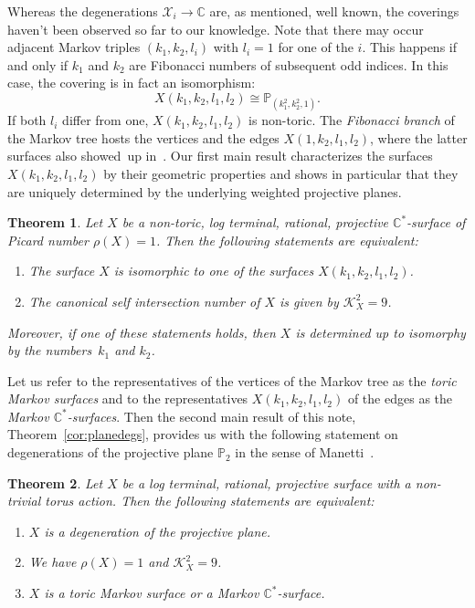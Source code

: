 \documentclass[10pt,a4paper]{amsart}
\newtheorem{thm}{Theorem}[section]
\theoremstyle{definition}
\def\CC{{\mathbb C}}
\def\PP{{\mathbb P}}
\begin{document}
Whereas the degenerations $\mathcal{X}_i \to \CC$
are, as mentioned, well known, the coverings haven't
been observed so far to our knowledge.
Note that there may occur adjacent Markov triples
$(k_1,k_2,l_i)$ with $l_i=1$ for one of the $i$.
This happens if and only if $k_1$ and $k_2$ are
Fibonacci numbers of subsequent odd indices.
In this case, the covering is in fact an isomorphism:
\[
X(k_1,k_2,l_1,l_2) \cong \PP_{(k_1^2,k_2^2,1)}.
\]
If both $l_i$ differ from one, $X(k_1,k_2,l_1,l_2)$
is non-toric.
The \emph{Fibonacci branch} of the Markov tree
hosts the vertices \smash{$\PP_{(1,k_2^2,l^2)}$}
and the edges $X(1,k_2,l_1,l_2)$, where the latter
surfaces also showed~up in~\cite[Remark~6.6]{LiXuZh}.
Our first main result characterizes the surfaces
$X(k_1,k_2,l_1,l_2)$ by their geometric
properties and shows in particular that they
are uniquely determined by the underlying weighted
projective planes.


\begin{thm}
Let $X$ be a non-toric, log terminal,
rational, projective $\CC^*$-surface of Picard
number $\rho(X) = 1$.
Then the following statements are equivalent:
\begin{enumerate}\itemsep=0pt
\item[$(i)$]
The surface $X$ is isomorphic to one of the
surfaces $X(k_1,k_2,l_1,l_2)$.
\item[$(ii)$]
The canonical self intersection number of $X$
is given by $\mathcal{K}_X^2 = 9$.
\end{enumerate}
Moreover, if one of these statements holds, then $X$ is
determined up to isomorphy by the numbers~$k_1$ and $k_2$.
\end{thm}


Let us refer to the representatives \smash{$\PP_{(k_1^2,k_2^2,l_i^2)}$}
of the vertices of the Markov tree as the
\emph{toric Markov surfaces}
and to the representatives $X(k_1,k_2,l_1,l_2)$
of the edges as the \emph{Markov $\CC^*$-surfaces}.
Then the second main result of this note,
Theorem~\ref{cor:planedegs}, provides
us with the following statement on degenerations
of the projective plane $\PP_2$ in the sense of
Manetti~\cite[Definition~1]{Ma}.

\goodbreak

\begin{thm}
Let $X$ be a log terminal,
rational, projective surface
with a non-trivial torus action.
Then the following statements are equivalent:
\begin{enumerate}\itemsep=0pt
\item[$(i)$]
$X$ is a degeneration of the projective
plane.
\item[$(ii)$]
We have $\rho(X) = 1$ and $\mathcal{K}_X^2 = 9$.
\item[$(iii)$]
$X$ is a toric Markov surface or a
Markov $\CC^*$-surface.
\end{enumerate}
\end{thm}
\end{document}

